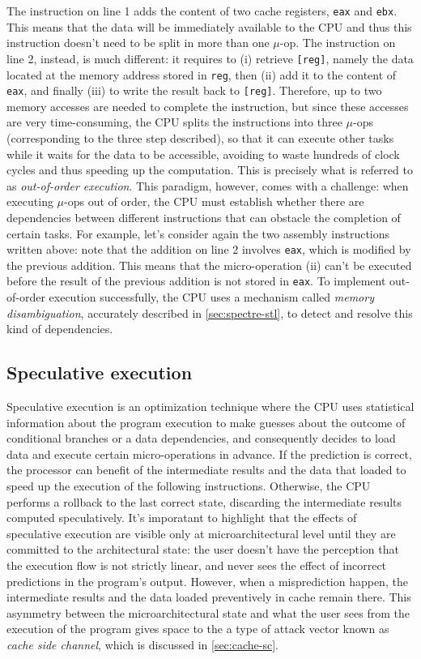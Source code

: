 \documentclass[12pt,a4paper]{book}
\theoremstyle{definition}
\begin{document}
	The instruction on line 1 adds the content of two cache registers, \texttt{eax} and \texttt{ebx}. This means that the data will be immediately available to the CPU and thus this instruction doesn't need to be split in more than one $\mu$-op. The instruction on line 2, instead, is much different: it requires to (i) retrieve \texttt{[reg]}, namely the data located at the memory address stored in \texttt{reg}, then (ii) add it to the content of \texttt{eax}, and finally (iii) to write the result back to \texttt{[reg]}. Therefore, up to two memory accesses are needed to complete the instruction, but since these accesses are very time-consuming, the CPU splits the instructions into three $\mu$-ops (corresponding to the three step described), so that it can execute other tasks while it waits for the data to be accessible, avoiding to waste hundreds of clock cycles and thus speeding up the computation. This is precisely what is referred to as \textit{out-of-order execution}. This paradigm, however, comes with a challenge: when executing $\mu$-ops out of order, the CPU must establish whether there are dependencies between different instructions that can obstacle the completion of certain tasks.	For example, let's consider again the two assembly instructions written above: note that the addition on line 2 involves \texttt{eax}, which is modified by the previous addition. This means that the micro-operation (ii) can't be executed before the result of the previous addition is not stored in \texttt{eax}. To implement out-of-order execution successfully, the CPU uses a mechanism called \textit{memory disambiguation}, accurately described in \ref{sec:spectre-stl}, to detect and resolve this kind of dependencies. 
	
	\subsection{Speculative execution}\label{sec:speculative-exec}
	Speculative execution is an optimization technique where the CPU uses statistical information about the program execution to make guesses about the outcome of conditional branches or a data dependencies, and consequently decides to load data and execute certain micro-operations in advance. If the prediction is correct, the processor can benefit of the intermediate results and the data that loaded to speed up the execution of the following instructions. Otherwise, the CPU performs a rollback to the last correct state, discarding the intermediate results computed speculatively. It's imporatant to highlight that the effects of speculative execution are visible only at microarchitectural level until they are committed to the architectural state: the user doesn't have the perception that the execution flow is not strictly linear, and never sees the effect of incorrect predictions in the program's output. However, when a misprediction happen, the intermediate results and the data loaded preventively in cache remain there. This asymmetry between the microarchitectural state and what the user sees from the execution of the program gives space to the a type of attack vector known as \textit{cache side channel}, which is discussed in \ref{sec:cache-sc}.
	
\end{document}
